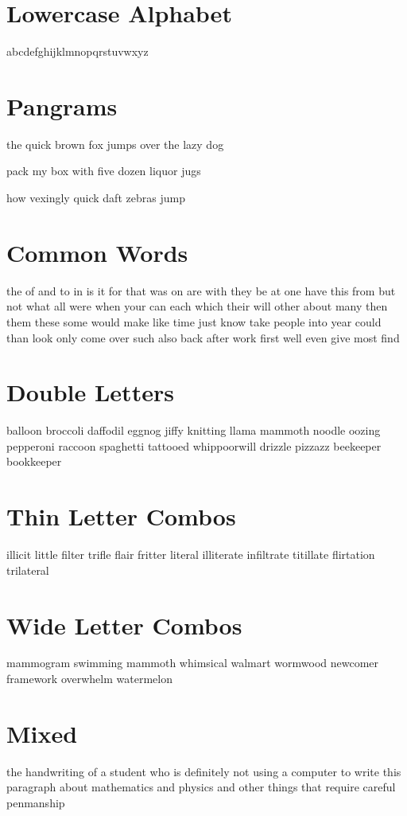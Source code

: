 \documentclass{article}
\begin{document}
\section*{Lowercase Alphabet}

abcdefghijklmnopqrstuvwxyz

\section*{Pangrams}

the quick brown fox jumps over the lazy dog

pack my box with five dozen liquor jugs

how vexingly quick daft zebras jump

\section*{Common Words}

the of and to in is it for that was on are with they be at one have this from but not what all were when your can each which their will other about many then them these some would make like time just know take people into year could than look only come over such also back after work first well even give most find

\section*{Double Letters}

balloon broccoli daffodil eggnog jiffy knitting llama mammoth noodle oozing pepperoni raccoon spaghetti tattooed whippoorwill drizzle pizzazz beekeeper bookkeeper

\section*{Thin Letter Combos}

illicit little filter trifle flair fritter literal illiterate infiltrate titillate flirtation trilateral

\section*{Wide Letter Combos}

mammogram swimming mammoth whimsical walmart wormwood newcomer framework overwhelm watermelon

\section*{Mixed}

the handwriting of a student who is definitely not using a computer to write this paragraph about mathematics and physics and other things that require careful penmanship
\end{document}
